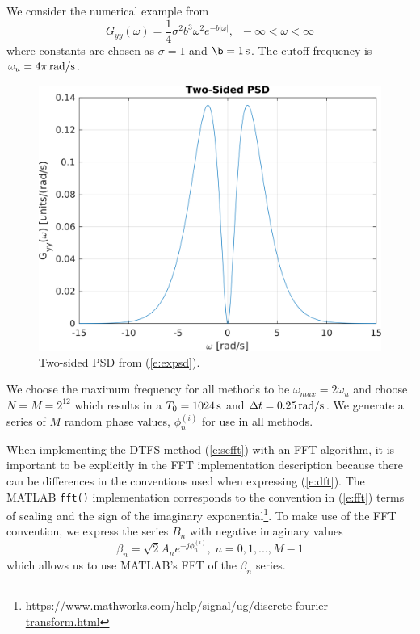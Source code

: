 \documentclass[techreport, article]{npsreport2018}
\begin{document}
We consider the numerical example from \cite{shinozuka91simulation}
\begin{equation}
  G_{yy}(\omega) = \frac{1}{4} \sigma^2 b^3 \omega^2 e^{-b|\omega|}, \; \; -\infty < \omega < \infty
  \label{e:expsd}
\end{equation}
where constants are chosen as $\sigma=1$ and $\b=\unit[1]{s}$. The cutoff frequency is  $\omega_u = \unit[4 \pi]{rad/s} $.
\begin{figure}[hbt!]
  \centering
  \includegraphics[width=\FigWidth\textwidth]{images/two_sided.png}
  \caption{Two-sided PSD from (\ref{e:expsd}).}
  \label{f:psd}
\end{figure}
We choose the maximum frequency for all methods to be $\omega_{max}=2\omega_u$ and choose $N=M=2^{12}$ which results in a $T_0 = \unit[1024]{s}$ and $\Delta t = \unit[0.25]{rad/s}$.  We generate a series of $M$ random phase values, $\phi^{(i)}_n$ for use in all methods.

When implementing the DTFS method (\ref{e:scfft}) with an FFT algorithm, it is important to be explicitly in the FFT implementation description because there can be differences in the conventions used when expressing (\ref{e:dft}).  The MATLAB \texttt{fft()} implementation corresponds to the convention in (\ref{e:fft}) terms of scaling and the sign of the imaginary exponential\footnote{\url{https://www.mathworks.com/help/signal/ug/discrete-fourier-transform.html}}.  To make use of the FFT convention, we express the series $B_n$ with negative imaginary values
\begin{equation}
  \beta_n = \sqrt{2} A_n e^{-j\phi^{(i)}_n}, \; n=0,1,...,M-1
\end{equation}
which allows us to use MATLAB's FFT of the $\beta_n$ series.
\end{document}
